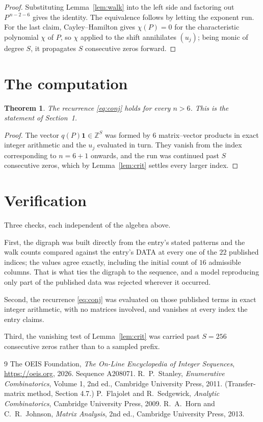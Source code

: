 \documentclass[11pt,a4paper]{article}
\theoremstyle{plain}
\newtheorem{theorem}{Theorem}
\theoremstyle{definition}
\begin{document}
\begin{proof}
Substituting Lemma~\ref{lem:walk} into the left side and factoring out
$P^{\,n-2-6}$ gives the identity. The equivalence follows by letting the exponent
run. For the last claim, Cayley--Hamilton gives $\chi(P)=0$ for the characteristic
polynomial $\chi$ of $P$, so $\chi$ applied to the shift annihilates $(u_j)$; being monic of
degree $S$, it propagates $S$ consecutive zeros forward.
\end{proof}

\section{The computation}

\begin{theorem}
The recurrence \eqref{eq:conj} holds for every $n>6$. This is the statement of
Section~1.
\end{theorem}

\begin{proof}
The vector $q(P)\mathbf{1}\in\mathbb{Z}^{S}$ was formed by $6$ matrix--vector
products in exact integer arithmetic and the $u_j$ evaluated in turn. They vanish from the
index corresponding to $n=6+1$ onwards, and the run was continued past $S$ consecutive
zeros, which by Lemma~\ref{lem:crit} settles every larger index.
\end{proof}

\section{Verification}

Three checks, each independent of the algebra above.

First, the digraph was built directly from the entry's stated patterns and the walk counts
compared against the entry's DATA at every one of the $22$ published indices; the
values agree exactly, including the initial count of $16$ admissible columns. That is
what ties the digraph to the sequence, and a model reproducing only part of the published
data was rejected wherever it occurred.

Second, the recurrence \eqref{eq:conj} was evaluated on those published terms in exact
integer arithmetic, with no matrices involved, and vanishes at every index the entry claims.

Third, the vanishing test of Lemma~\ref{lem:crit} was carried past $S=256$ consecutive
zeros rather than to a sampled prefix.

\begin{thebibliography}{9}
 The OEIS Foundation, \emph{The On-Line Encyclopedia of Integer
Sequences}, \url{https://oeis.org}, 2026. Sequence A208071.
 R.~P.~Stanley, \emph{Enumerative Combinatorics}, Volume 1, 2nd ed.,
Cambridge University Press, 2011. (Transfer-matrix method, Section 4.7.)
 P.~Flajolet and R.~Sedgewick, \emph{Analytic Combinatorics}, Cambridge
University Press, 2009.
 R.~A.~Horn and C.~R.~Johnson, \emph{Matrix Analysis}, 2nd ed., Cambridge
University Press, 2013.
\end{thebibliography}
\end{document}

